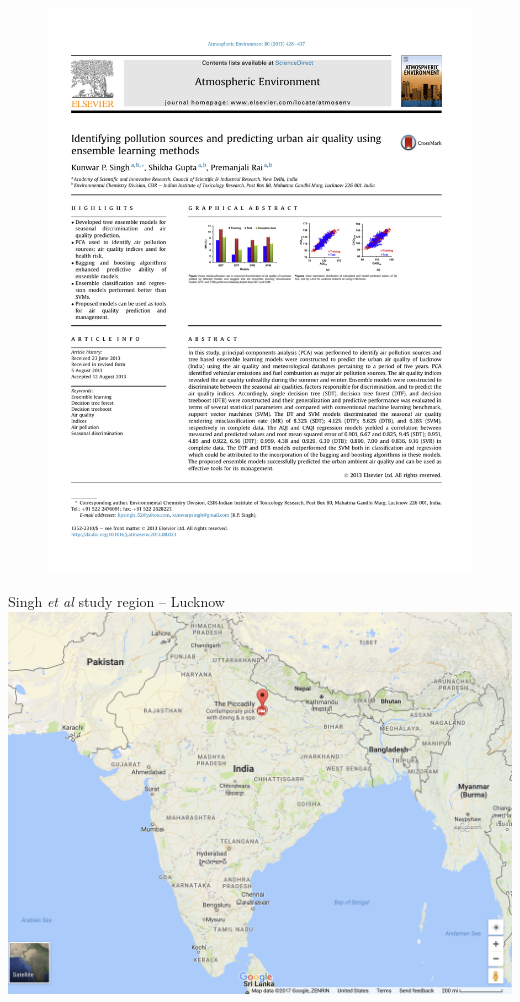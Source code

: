 \documentclass[mathserif, aspectratio=169]{beamer}
\begin{document}
\begin{frame}{}
\begin{figure}
\includegraphics[height=\textheight]{singh_etal}
\caption*{}
\end{figure}
\end{frame}

\begin{frame}{Singh \textit{et al} study region -- Lucknow}
\includegraphics[height=0.9\textheight]{lucknow}
\end{frame}
\end{document}
